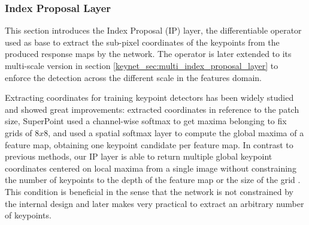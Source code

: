 
\subsubsection{Index Proposal Layer}
\label{keynet_sec:single_index_proposal_layer}

This section introduces the Index Proposal (IP) layer, the differentiable operator used as base to extract the sub-pixel coordinates of the keypoints from the produced response maps by the network. The operator is later extended to its multi-scale version in section \ref{keynet_sec:multi_index_proposal_layer} to enforce the detection across the different scale in the features domain. 

Extracting coordinates for training keypoint detectors has been widely studied and showed great improvements: \cite{LIFT, Karel_Vedaldi_ECCV_16, Zhang_Felix_CVPR_17} extracted coordinates in reference to the patch size, SuperPoint \cite{detone2017superpoint} used a channel-wise softmax to get maxima belonging to fix grids of $8x8$, and \cite{keypointnet_nips_18} used a spatial softmax layer to compute the global maxima of a feature map, obtaining one keypoint candidate per feature map. In contrast to previous methods, our IP layer is able to return multiple global keypoint coordinates centered on local maxima from a single image without constraining the number of keypoints to the depth of the feature map \cite{keypointnet_nips_18} or the size of the grid \cite{detone2017superpoint}. This condition is beneficial in the sense that the network is not constrained by the internal design and later makes very practical to extract an arbitrary number of keypoints.

